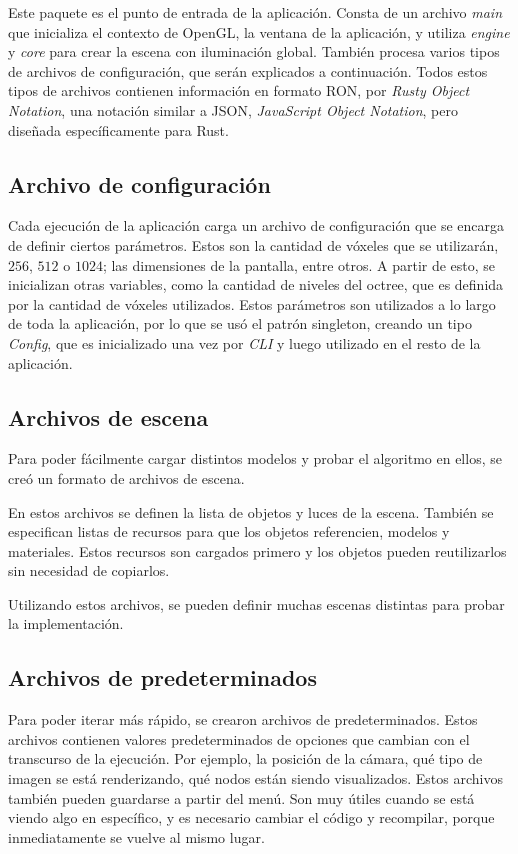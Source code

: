 Este paquete es el punto de entrada de la aplicación.
Consta de un archivo \textit{main} que inicializa el contexto de OpenGL, la ventana de la aplicación, y utiliza \textit{engine} y \textit{core} para crear la escena con iluminación global.
También procesa varios tipos de archivos de configuración, que serán explicados a continuación.
Todos estos tipos de archivos contienen información en formato RON, por \textit{Rusty Object Notation}, una notación similar a JSON, \textit{JavaScript Object Notation}, pero diseñada específicamente para Rust.

\subsection{Archivo de configuración}

Cada ejecución de la aplicación carga un archivo de configuración que se encarga de definir ciertos parámetros.
Estos son la cantidad de vóxeles que se utilizarán, $256$, $512$ o $1024$; las dimensiones de la pantalla, entre otros.
A partir de esto, se inicializan otras variables, como la cantidad de niveles del octree, que es definida por la cantidad de vóxeles utilizados.
Estos parámetros son utilizados a lo largo de toda la aplicación, por lo que se usó el patrón singleton, creando un tipo \textit{Config}, que es inicializado una vez por \textit{CLI} y luego utilizado en el resto de la aplicación.

\subsection{Archivos de escena}

Para poder fácilmente cargar distintos modelos y probar el algoritmo en ellos, se creó un formato de archivos de escena.

En estos archivos se definen la lista de objetos y luces de la escena.
También se especifican listas de recursos para que los objetos referencien, modelos y materiales.
Estos recursos son cargados primero y los objetos pueden reutilizarlos sin necesidad de copiarlos.

Utilizando estos archivos, se pueden definir muchas escenas distintas para probar la implementación.

\subsection{Archivos de predeterminados}

Para poder iterar más rápido, se crearon archivos de predeterminados.
Estos archivos contienen valores predeterminados de opciones que cambian con el transcurso de la ejecución.
Por ejemplo, la posición de la cámara, qué tipo de imagen se está renderizando, qué nodos están siendo visualizados.
Estos archivos también pueden guardarse a partir del menú.
Son muy útiles cuando se está viendo algo en específico, y es necesario cambiar el código y recompilar, porque inmediatamente se vuelve al mismo lugar.
